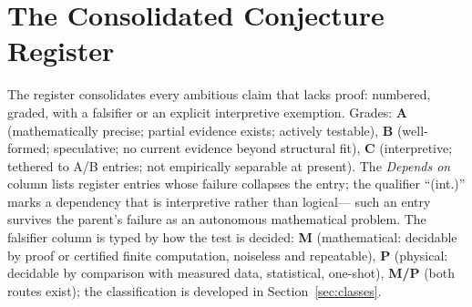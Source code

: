 \documentclass[11pt,a4paper]{article}
\theoremstyle{plain}
\theoremstyle{definition}
\theoremstyle{remark}
\begin{document}
\section{The Consolidated Conjecture Register}\label{sec:register}

The register consolidates every ambitious claim that lacks proof: numbered, graded, with a
falsifier or an explicit interpretive exemption. Grades: \textbf{A} (mathematically
precise; partial evidence exists; actively
testable), \textbf{B} (well-formed; speculative; no current evidence beyond structural
fit), \textbf{C} (interpretive; tethered to A/B entries; not empirically separable at
present). The \emph{Depends on} column lists register entries whose failure collapses the
entry; the qualifier ``(int.)'' marks a dependency that is interpretive rather than logical---
such an entry survives the parent's failure as an autonomous mathematical problem. The
falsifier column is typed by how the test is decided: \textbf{M} (mathematical: decidable
by proof or certified finite computation, noiseless and repeatable), \textbf{P} (physical:
decidable by comparison with measured data, statistical, one-shot), \textbf{M/P} (both
routes exist); the classification is developed in Section~\ref{sec:classes}.
\end{document}
